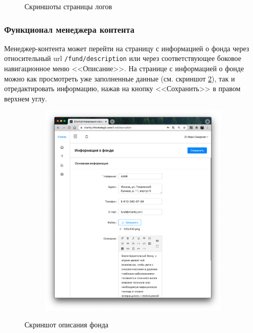 \documentclass[a4paper,12pt,reqno]{article}
\begin{document}
\begin{figure}[H]
\begin{subfigure}[b]{0.475\linewidth}
		\end{subfigure}
		\caption{Скриншоты страницы логов}
		\label{pic: logs}
	\end{figure}
	
	\subsubsection{Функционал менеджера контента}
	
	Менеджер-контента может перейти на страницу с информацией о фонда через относительный url \texttt{/fund/description} или через соответствующее боковое навигационное меню <<Описание>>. На странице с информацией о фонде можно как просмотреть уже заполненные данные (см. скриншот \ref{pic: fund_description}), так и отредактировать информацию, нажав на кнопку <<Сохранить>> в правом верхнем углу.
	
	\begin{figure}[H]
		\centering
		\begin{subfigure}[b]{0.475\linewidth}
			\includegraphics[width=\linewidth]{img/ro/fund_description.png}
		\end{subfigure}
		\caption{Скриншот описания фонда}
		\label{pic: fund_description}
	\end{figure}
	
\end{document}
